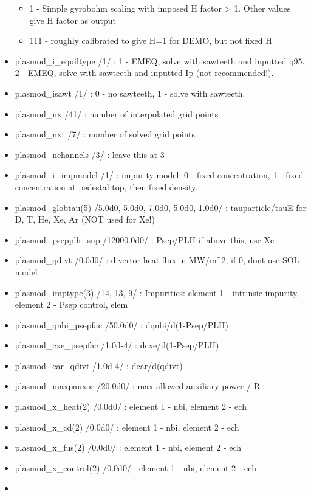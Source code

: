 \documentclass[]{article}
\providecommand{\tightlist}{%
  \setlength{\itemsep}{0pt}\setlength{\parskip}{0pt}}
\begin{document}
\begin{itemize}
  \begin{itemize}
  \tightlist
  \item
    1 - Simple gyrobohm scaling with imposed H factor \textgreater{} 1.
    Other values give H factor as output
  \item
    111 - roughly calibrated to give H=1 for DEMO, but not fixed H
  \end{itemize}
\item
  plasmod\_i\_equiltype /1/ : 1 - EMEQ, solve with sawteeth and inputted
  q95. 2 - EMEQ, solve with sawteeth and inputted Ip (not recommended!).
\item
  plasmod\_isawt /1/ : 0 - no sawteeth, 1 - solve with sawteeth.
\item
  plasmod\_nx /41/ : number of interpolated grid points
\item
  plasmod\_nxt /7/ : number of solved grid points
\item
  plasmod\_nchannels /3/ : leave this at 3
\item
  plasmod\_i\_impmodel /1/ : impurity model: 0 - fixed concentration, 1
  - fixed concentration at pedestal top, then fixed density.
\item
  plasmod\_globtau(5) /5.0d0, 5.0d0, 7.0d0, 5.0d0, 1.0d0/ :
  tauparticle/tauE for D, T, He, Xe, Ar (NOT used for Xe!)
\item
  plasmod\_psepplh\_sup /12000.0d0/ : Psep/PLH if above this, use Xe
\item
  plasmod\_qdivt /0.0d0/ : divertor heat flux in MW/m\^{}2, if 0, dont
  use SOL model
\item
  plasmod\_imptype(3) /14, 13, 9/ : Impurities: element 1 - intrinsic
  impurity, element 2 - Psep control, elem
\item
  plasmod\_qnbi\_psepfac /50.0d0/ : dqnbi/d(1-Psep/PLH)
\item
  plasmod\_cxe\_psepfac /1.0d-4/ : dcxe/d(1-Psep/PLH)
\item
  plasmod\_car\_qdivt /1.0d-4/ : dcar/d(qdivt)
\item
  plasmod\_maxpauxor /20.0d0/ : max allowed auxiliary power / R
\item
  plasmod\_x\_heat(2) /0.0d0/ : element 1 - nbi, element 2 - ech
\item
  plasmod\_x\_cd(2) /0.0d0/ : element 1 - nbi, element 2 - ech
\item
  plasmod\_x\_fus(2) /0.0d0/ : element 1 - nbi, element 2 - ech
\item
  plasmod\_x\_control(2) /0.0d0/ : element 1 - nbi, element 2 - ech
\item

\end{itemize}
\end{document}
